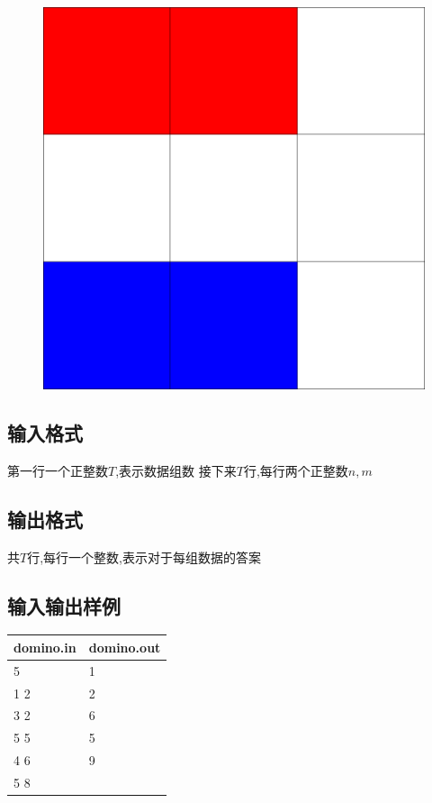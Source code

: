 \documentclass[12pt]{ctexart}
\begin{document}
\begin{figure}[htbp]
\begin{minipage}[t]{0.3\textwidth}
			\caption{}
		\end{minipage}
		\begin{minipage}[t]{0.3\textwidth}
			\centering
			\includegraphics{pictures/1-3.png}
			\caption{}
		\end{minipage}
	\end{figure}

	\subsection{输入格式}
	第一行一个正整数$T$,表示数据组数
	接下来$T$行,每行两个正整数$n,m$
	\subsection{输出格式}
	共$T$行,每行一个整数,表示对于每组数据的答案
	\subsection{输入输出样例}
	\begin{center}
		\begin{tabular}{|p{6cm}|p{6cm}|}
			\hline domino.in&domino.out\\
			\hline	5&1\\
					1 2&2\\
					3 2&6\\
					5 5&5\\
					4 6&9\\
					5 8&\\
			\hline
		\end{tabular}
	\end{center}
\end{document}
